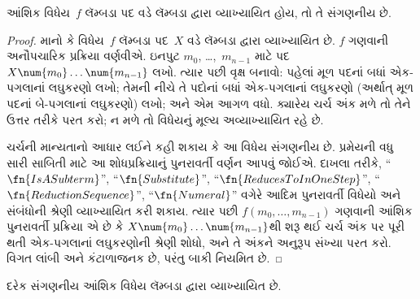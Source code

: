 \begingroup
\makeatletter{}\makeatother

\label{guunit:OLP-0349}


\begin{thm}
આંશિક વિધેય~$f$ લૅમ્બડા પદ વડે લૅમ્બડા દ્વારા વ્યાખ્યાયિત હોય, તો તે
સંગણનીય છે.
\end{thm}

\begin{proof}
માનો કે વિધેય~$f$ લૅમ્બડા પદ~$X$ વડે લૅમ્બડા દ્વારા વ્યાખ્યાયિત છે.
$f$ ગણવાની અનૌપચારિક પ્રક્રિયા વર્ણવીએ. ઇનપુટ $m_0$,
\dots,~$m_{n-1}$ માટે પદ $X \num{m_0} \ldots \num{m_{n-1}}$
લખો. ત્યાર પછી વૃક્ષ બનાવો: પહેલાં મૂળ પદનાં બધાં એક-પગલાનાં
લઘુકરણો લખો; તેમની નીચે તે પદોનાં બધાં એક-પગલાનાં લઘુકરણો
(અર્થાત્ મૂળ પદનાં બે-પગલાનાં લઘુકરણો) લખો; અને એમ આગળ વધો.
ક્યારેય ચર્ચ અંક મળે તો તેને ઉત્તર તરીકે પરત કરો; ન મળે તો
વિધેયનું મૂલ્ય અવ્યાખ્યાયિત રહે છે.

ચર્ચની માન્યતાનો આધાર લઈને કહી શકાય કે આ વિધેય સંગણનીય છે.
પ્રમેયની વધુ સારી સાબિતી માટે આ શોધપ્રક્રિયાનું પુનરાવર્તી વર્ણન
આપવું જોઈએ. દાખલા તરીકે,
``$\fn{IsASubterm}$'', ``$\fn{Substitute}$'',
``$\fn{ReducesToInOneStep}$'', ``$\fn{ReductionSequence}$'',
``$\fn{Numeral}$'' વગેરે આદિમ પુનરાવર્તી વિધેયો અને સંબંધોની
શ્રેણી વ્યાખ્યાયિત કરી શકાય. ત્યાર પછી $f(m_0, \dots, m_{n-1})$
ગણવાની આંશિક પુનરાવર્તી પ્રક્રિયા એ છે કે
$X \num{m_0} \dots \num{m_{n-1}}$થી શરૂ થઈ ચર્ચ અંક પર પૂરી થતી
એક-પગલાનાં લઘુકરણોની શ્રેણી શોધો, અને તે અંકને અનુરૂપ સંખ્યા
પરત કરો. વિગત લાંબી અને કંટાળાજનક છે, પરંતુ બાકી નિયમિત છે.
\end{proof}
\endgroup


\begingroup
\makeatletter{}\makeatother

\label{guunit:OLP-0350}


\begin{thm}
દરેક સંગણનીય આંશિક વિધેય લૅમ્બડા દ્વારા વ્યાખ્યાયિત છે.
\end{thm}


